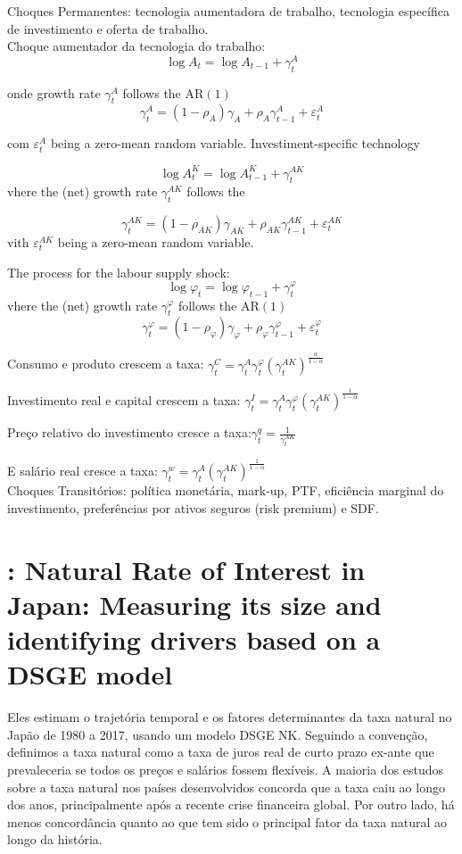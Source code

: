 Choques Permanentes: tecnologia aumentadora de trabalho, tecnologia específica de investimento e oferta de trabalho.\\

Choque aumentador da tecnologia do trabalho:
\[
\log A_{t}=\log A_{t-1}+\gamma_{t}^{A}
\]

onde  growth rate $\gamma_{t}^{A}$ follows the $\mathrm{AR(1)}$
\[
\gamma_{t}^{A}=\left(1-\rho_{A}\right) \gamma_{A}+\rho_{A} \gamma_{t-1}^{A}+\varepsilon_{t}^{A}
\]

com $\varepsilon_{t}^{A}$ being a zero-mean random variable.
Investiment-specific technology

\[
\log A_{t}^{K}=\log A_{t-1}^{K}+\gamma_{t}^{A K}
\]
vhere the (net) growth rate $\gamma_{t}^{A K}$ follows the

\[
\gamma_{t}^{A K}=\left(1-\rho_{A K}\right) \gamma_{A K}+\rho_{A K} \gamma_{t-1}^{A K}+\varepsilon_{t}^{A K}
\]
vith $\varepsilon_{t}^{A K}$ being a zero-mean random variable.

The process for the labour supply shock:
\[
\log \varphi_{t}=\log \varphi_{t-1}+\gamma_{t}^{\varphi}
\]
vhere the (net) growth rate $\gamma_{t}^{\varphi}$ follows the $\mathrm{AR(1)}$
\[
\gamma_{t}^{\varphi}=\left(1-\rho_{\varphi}\right) \gamma_{\varphi}+\rho_{\varphi} \gamma_{t-1}^{\varphi}+\varepsilon_{t}^{\varphi}
\]


Consumo e produto crescem a taxa: $\gamma_t^{C} = \gamma_t^{A}\gamma_t^{\varphi}(\gamma_t^{AK})^{\frac{\alpha}{1-\alpha}}$

Investimento real e capital crescem a taxa: $\gamma_t^{I} = \gamma_t^{A}\gamma_t^{\varphi}(\gamma_t^{AK})^{\frac{1}{1-\alpha}}$


Preço relativo do investimento cresce a taxa:$\gamma_t^{q} = \frac{1}{\gamma_t^{AK}}$

E salário real cresce a taxa: $\gamma_t^{w} = \gamma_t^{A}(\gamma_t^{AK})^{\frac{1}{1-\alpha}}$
\\


Choques Transitórios: política monetária, mark-up, PTF, eficiência marginal do investimento, preferências por ativos seguros (risk premium) e SDF.
%
%
\section{\citet{Okazaki:2018}: Natural Rate of Interest in Japan: Measuring its size and identifying drivers based on a DSGE model  }

Eles estimam o trajetória temporal e os fatores determinantes da taxa natural no Japão de 1980 a 2017, usando um modelo DSGE NK. Seguindo a convenção, definimos a taxa natural como a taxa de juros real de curto prazo ex-ante que prevaleceria se todos os preços e salários fossem flexíveis. A maioria dos estudos sobre a taxa natural nos países desenvolvidos concorda que a taxa caiu ao longo dos anos, principalmente após a recente crise financeira global. Por outro lado, há menos concordância quanto ao que tem sido o principal fator da taxa natural ao longo da história.

